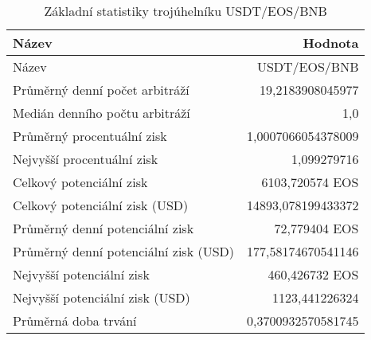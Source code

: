\begin{table}\centering
\caption{Základní statistiky trojúhelníku USDT/EOS/BNB}
\label{USDTEOSBNB_stats}
\begin{tabular}{|| l | r ||}
\hline Název & Hodnota \\ 
\hline\hline Název & USDT/EOS/BNB \\ 
\hline Průměrný denní počet arbitráží & 19,2183908045977 \\ 
\hline Medián denního počtu arbitráží & 1,0 \\ 
\hline Průměrný procentuální zisk & 1,0007066054378009 \\ 
\hline Nejvyšší procentuální zisk & 1,099279716 \\ 
\hline Celkový potenciální zisk & 6103,720574 EOS \\ 
\hline Celkový potenciální zisk (USD) & 14893,078199433372 \\ 
\hline Průměrný denní potenciální zisk & 72,779404 EOS \\ 
\hline Průměrný denní potenciální zisk (USD) & 177,58174670541146 \\ 
\hline Nejvyšší potenciální zisk & 460,426732 EOS \\ 
\hline Nejvyšší potenciální zisk (USD) & 1123,441226324 \\ 
\hline Průměrná doba trvání & 0,3700932570581745 \\ 
\hline
\end{tabular}
\end{table}